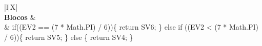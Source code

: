\begin{xltabular}{\textwidth}{|l|X|}
		 \\ \hline
		\textbf{Blocos} &  \\ \hline
		 & if((EV2 == (7 * Math.PI) / 6))\{   return SV6; \} else if ((EV2 < (7 * Math.PI) / 6))\{   return SV5; \} else \{   return SV4; \} \\ \hline



\end{xltabular}
